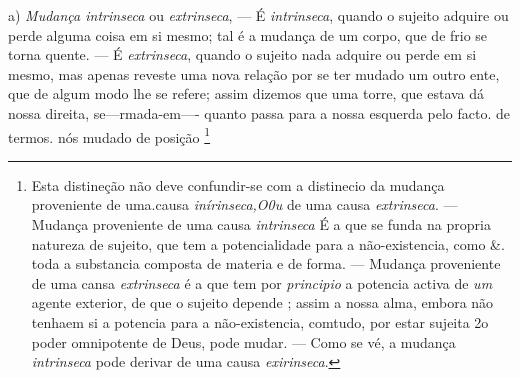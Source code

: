 a) \emph{Mudança intrinseca} ou \emph{extrinseca}, --- É \emph{intrinseca}, quando o sujeito adquire ou perde alguma coisa em si mesmo; tal é a mudança de um corpo, que de frio se torna quente. --- É \emph{extrinseca}, quando o sujeito nada adquire ou perde em si mesmo, mas apenas reveste uma nova relação por se ter mudado um outro ente, que de algum modo lhe se refere; assim dizemos que uma torre, que estava dá nossa direita, se---rmada-em---- quanto passa para a nossa esquerda pelo facto. de termos. nós mudado de posição \footnote{Esta distineção não deve confundir-se com a distinecio da mudança proveniente de uma.causa \emph{inírinseca,O0u} de uma causa \emph{extrinseca}. --- Mudança proveniente de uma causa \emph{intrinseca} É a que se funda na propria natureza de sujeito, que tem a potencialidade para a não-existencia, como \&. toda a substancia composta de materia e de forma. --- Mudança proveniente de uma cansa \emph{extrinseca} é a que tem por \emph{principio} a potencia activa de \emph{um} agente exterior, de que o sujeito depende ; assim a nossa alma, embora não tenhaem si a potencia para a não-existencia, comtudo, por estar sujeita 2o poder omnipotente de Deus, pode mudar. --- Como se vé, a mudança \emph{intrinseca} pode derivar de uma causa \emph{exirinseca}.}


